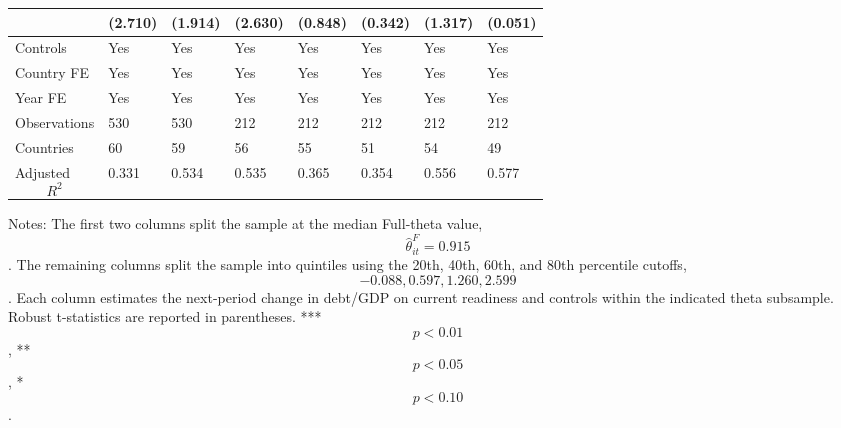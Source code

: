 \begin{table}[H]
\begin{threeparttable}
\begin{tabularx}{\textwidth}{lYYYYYYY}
  & (2.710) & (1.914) & (2.630) & (0.848) & (0.342) & (1.317) & (0.051) \\
\midrule
Controls & Yes & Yes & Yes & Yes & Yes & Yes & Yes \\
Country FE & Yes & Yes & Yes & Yes & Yes & Yes & Yes \\
Year FE & Yes & Yes & Yes & Yes & Yes & Yes & Yes \\
Observations & 530 & 530 & 212 & 212 & 212 & 212 & 212 \\
Countries & 60 & 59 & 56 & 55 & 51 & 54 & 49 \\
Adjusted $$R^2$$ & 0.331 & 0.534 & 0.535 & 0.365 & 0.354 & 0.556 & 0.577 \\
\bottomrule
\end{tabularx}
\begin{tablenotes}[flushleft]\footnotesize
\item Notes: The first two columns split the sample at the median Full-theta value, $$\widehat{\theta}^{F}_{it}=0.915$$. The remaining columns split the sample into quintiles using the 20th, 40th, 60th, and 80th percentile cutoffs, $$-0.088, 0.597, 1.260, 2.599$$. Each column estimates the next-period change in debt/GDP on current readiness and controls within the indicated theta subsample. Robust t-statistics are reported in parentheses. *** $$p<0.01$$, ** $$p<0.05$$, * $$p<0.10$$.
\end{tablenotes}
\end{threeparttable}
\end{table}
